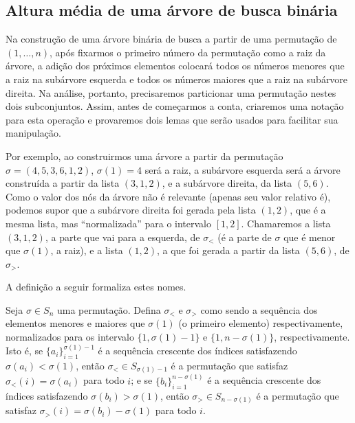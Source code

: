\subsection{Altura média de uma árvore de busca binária}

Na construção de uma árvore binária de busca
a partir de uma permutação de $(1, \dots, n)$,
após fixarmos o primeiro número da permutação como a raiz da árvore,
a adição dos próximos elementos colocará
todos os números menores que a raiz na subárvore esquerda
e todos os números maiores que a raiz na subárvore direita.
Na análise, portanto,
precisaremos particionar uma permutação nestes dois subconjuntos.
Assim,
antes de começarmos a conta,
criaremos uma notação para esta operação
e provaremos dois lemas que serão usados para facilitar sua manipulação.

Por exemplo, ao construirmos uma árvore
a partir da permutação $\sigma = (4, 5, 3, 6, 1, 2)$,
$\sigma(1) = 4$ será a raiz,
a subárvore esquerda será a árvore construída a partir da lista $(3, 1, 2)$,
e a subárvore direita, da lista $(5, 6)$.
Como o valor dos nós da árvore não é relevante (apenas seu valor relativo é),
podemos supor que a subárvore direita foi gerada pela lista $(1, 2)$,
que é a mesma lista,
mas ``normalizada'' para o intervalo $[1, 2]$.
Chamaremos a lista $(3, 1, 2)$,
a parte que vai para a esquerda, de $\sigma_<$
(é a parte de $\sigma$ que é menor que $\sigma(1)$, a raiz),
e a lista $(1, 2)$,
a que foi gerada a partir da lista $(5, 6)$, de $\sigma_>$.

A definição a seguir formaliza estes nomes.

\begin{definition}
    Seja $\sigma \in S_n$ uma permutação.
    Defina $\sigma_<$ e $\sigma_>$
    como sendo a sequência dos elementos menores e maiores que $\sigma(1)$
    (o primeiro elemento)
    respectivamente,
    normalizados para os intervalo $\{1, \sigma(1) - 1\}$ e $\{1, n - \sigma(1)\}$,
    respectivamente.
    Isto é,
    se $\{a_i\}_{i = 1}^{\sigma(1)-1}$ é a sequência crescente
    dos índices satisfazendo $\sigma(a_i) < \sigma(1)$,
    então $\sigma_< \in S_{\sigma(1) - 1}$
    é a permutação que satisfaz $\sigma_<(i) = \sigma(a_i)$ para todo $i$;
    e se $\{b_i\}_{i = 1}^{n - \sigma(1)}$ é a sequência crescente
    dos índices satisfazendo $\sigma(b_i) > \sigma(1)$,
    então $\sigma_> \in S_{n - \sigma(1)}$
    é a permutação que satisfaz $\sigma_>(i) = \sigma(b_i) - \sigma(1)$ para todo $i$.
\end{definition}

